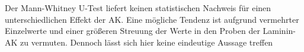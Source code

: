  Der Mann-Whitney U-Test liefert keinen statistischen Nachweis für einen unterschiedlichen Effekt der AK. Eine mögliche Tendenz ist aufgrund vermehrter Einzelwerte und einer größeren Streuung der Werte in den Proben der Laminin-AK zu vermuten. Dennoch lässt sich hier keine eindeutige Aussage treffen 
\clearpage
%
%
%
%
